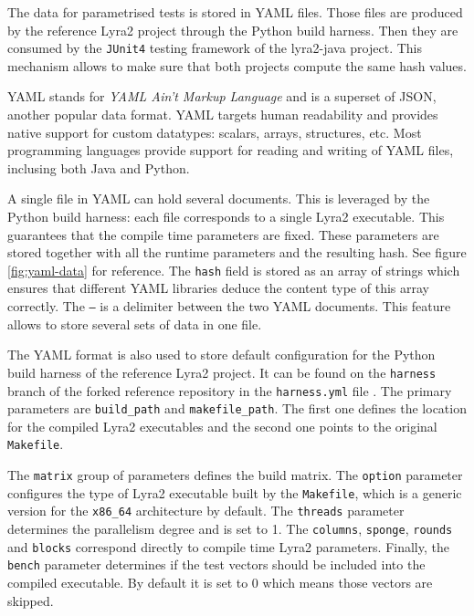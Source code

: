 The data for parametrised tests is stored in YAML files. Those files are produced by the reference Lyra2 project through the Python build harness. Then they are consumed by the \texttt{JUnit4} testing framework of the lyra2-java project. This mechanism allows to make sure that both projects compute the same hash values.

YAML stands for \emph{YAML Ain't Markup Language} and is a superset of JSON, another popular data format. YAML targets human readability and provides native support for custom datatypes: scalars, arrays, structures, etc. Most programming languages provide support for reading and writing of YAML files, inclusing both Java and Python.

A single file in YAML can hold several documents. This is leveraged by the Python build harness: each file corresponds to a single Lyra2 executable. This guarantees that the compile time parameters are fixed. These parameters are stored together with all the runtime parameters and the resulting hash. See figure \ref{fig:yaml-data} for reference. The \texttt{hash} field is stored as an array of strings which ensures that different YAML libraries deduce the content type of this array correctly. The \texttt{---} is a delimiter between the two YAML documents. This feature allows to store several sets of data in one file.

The YAML format is also used to store default configuration for the Python build harness of the reference Lyra2 project. It can be found on the \texttt{harness} branch of the forked reference repository in the \texttt{harness.yml} file \cite{github:2017:lyra-copy}. The primary parameters are \texttt{build_path} and \texttt{makefile_path}. The first one defines the location for the compiled Lyra2 executables and the second one points to the original \texttt{Makefile}.

The \texttt{matrix} group of parameters defines the build matrix. The \texttt{option} parameter configures the type of Lyra2 executable built by the \texttt{Makefile}, which is a generic version for the \texttt{x86_64} architecture by default. The \texttt{threads} parameter determines the parallelism degree and is set to 1. The \texttt{columns}, \texttt{sponge}, \texttt{rounds} and \texttt{blocks} correspond directly to compile time Lyra2 parameters. Finally, the \texttt{bench} parameter determines if the test vectors should be included into the compiled executable. By default it is set to 0 which means those vectors are skipped.

